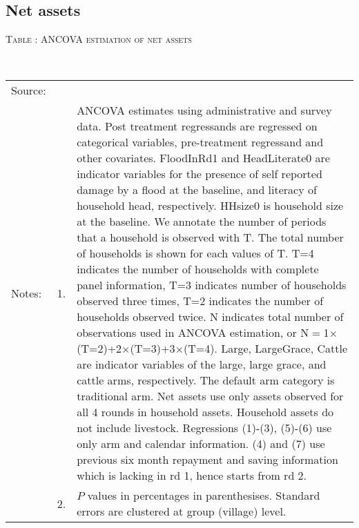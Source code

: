 \subsection{Net assets}


\hspace{-1cm}\begin{minipage}[t]{14cm}
\hfil\textsc{\normalsize Table \thetable: ANCOVA estimation of net assets\label{tab ANCOVA net assets}}\\
\setlength{\tabcolsep}{1pt}
\setlength{\baselineskip}{8pt}
\renewcommand{\arraystretch}{.55}
\hfil{}\\
\renewcommand{\arraystretch}{.8}
\setlength{\tabcolsep}{1pt}
\begin{tabular}{>{\hfill\scriptsize}p{1cm}<{}>{\hfill\scriptsize}p{.25cm}<{}>{\scriptsize}p{12cm}<{\hfill}}
Source:& \multicolumn{2}{l}{\scriptsize Estimated with GUK administrative and survey data.}\\
Notes: & 1. & ANCOVA estimates using administrative and survey data. Post treatment regressands are regressed on categorical variables, pre-treatment regressand and other covariates. \textsf{FloodInRd1} and \textsf{HeadLiterate0} are indicator variables for the presence of self reported damage by a flood at the baseline, and literacy of household head, respectively. \textsf{HHsize0} is household size at the baseline. We annotate the number of periods that a household is observed with \textsf{T}. The total number of households is shown for each values of \textsf{T}. \textsf{T=4} indicates the number of households with complete panel information, \textsf{T=3} indicates number of households observed three times, \textsf{T=2} indicates the number of households observed twice. \textsf{N} indicates total number of observations used in ANCOVA estimation, or \textsf{N$=$1$\times$(T=2)+2$\times$(T=3)+3$\times$(T=4)}.  \textsf{Large}, \textsf{LargeGrace}, \textsf{Cattle} are indicator variables of the \textsf{large}, \textsf{large grace}, and \textsf{cattle} arms, respectively. The default arm category is \textsf{traditional} arm. Net assets use only assets observed for all 4 rounds in household assets. Household assets do not include livestock. Regressions (1)-(3), (5)-(6) use only arm and calendar information. (4) and (7) use previous six month repayment and saving information which is lacking in rd 1, hence starts from rd 2.\\
& 2. & $P$ values in percentages in parenthesises. Standard errors are clustered at group (village) level.
\end{tabular}
\end{minipage}

